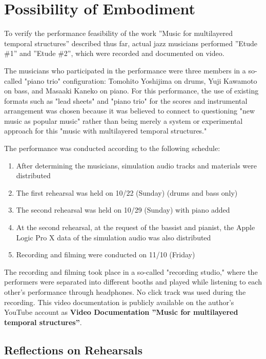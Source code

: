 \section{Possibility of Embodiment}

To verify the performance feasibility of the work ''Music for multilayered temporal structures'' described thus far, actual jazz musicians performed ''Etude \#1'' and ''Etude \#2'', which were recorded and documented on video.

The musicians who participated in the performance were three members in a so-called "piano trio" configuration: Tomohito Yoshijima on drums, Yuji Kawamoto on bass, and Masaaki Kaneko on piano. For this performance, the use of existing formats such as "lead sheets" and "piano trio" for the scores and instrumental arrangement was chosen because it was believed to connect to questioning "new music as popular music" rather than being merely a system or experimental approach for this "music with multilayered temporal structures."

The performance was conducted according to the following schedule:

\begin{enumerate}
  \item After determining the musicians, simulation audio tracks and materials were distributed
  \item The first rehearsal was held on 10/22 (Sunday) (drums and bass only)
	\item The second rehearsal was held on 10/29 (Sunday) with piano added
	\item At the second rehearsal, at the request of the bassist and pianist, the Apple Logic Pro X data of the simulation audio was also distributed
	\item Recording and filming were conducted on 11/10 (Friday)
\end{enumerate}

The recording and filming took place in a so-called "recording studio," where the performers were separated into different booths and played while listening to each other's performance through headphones. No click track was used during the recording. This video documentation is publicly available on the author's YouTube account as {\bf Video Documentation ''Music for multilayered temporal structures''}\cite{yamato:04}.

\subsection{Reflections on Rehearsals}

